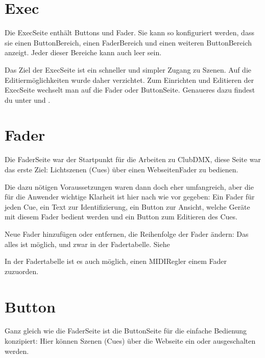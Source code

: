 \documentclass[letterpaper,10pt,ngerman]{sphinxmanual}
\begin{document}
\noindent{}


\section{Exec}
\label{\detokenize{arbeiten:exec}}
Die Exec\sphinxhyphen{}Seite enthält Buttons und Fader. Sie kann so konfiguriert werden,
dass sie einen Button\sphinxhyphen{}Bereich, einen Fader\sphinxhyphen{}Bereich und einen weiteren
Button\sphinxhyphen{}Bereich anzeigt. Jeder dieser Bereiche kann auch leer sein.

Das Ziel der Exec\sphinxhyphen{}Seite ist ein schneller und simpler Zugang zu Szenen.
Auf die Editiermöglichkeiten wurde daher verzichtet. Zum
Einrichten und Editieren der Exec\sphinxhyphen{}Seite wechselt man auf die Fader\sphinxhyphen{} oder
Button\sphinxhyphen{}Seite. Genaueres dazu findest du unter {\hyperref[\detokenize{einrichten:fader}]{}} und
{\hyperref[\detokenize{einrichten:buttons}]{}} .

\noindent{}


\section{Fader}
\label{\detokenize{arbeiten:fader}}
Die Fader\sphinxhyphen{}Seite war der Startpunkt für die Arbeiten zu ClubDMX, diese Seite
war das erste Ziel: Lichtszenen (Cues) über einen
Webseiten\sphinxhyphen{}Fader zu bedienen.

Die dazu nötigen Voraussetzungen waren dann doch eher umfangreich, aber die
für die Anwender wichtige Klarheit ist hier nach wie vor gegeben: Ein Fader für
jeden Cue,
ein Text zur Identifizierung, ein Button zur Ansicht, welche Geräte mit diesem
Fader bedient werden und ein Button zum Editieren des Cues.

Neue Fader hinzufügen oder entfernen, die Reihenfolge der Fader ändern: Das
alles ist möglich, und zwar in der Fadertabelle.
Siehe {\hyperref[\detokenize{einrichten:fader}]{}}

In der Fadertabelle ist es auch möglich, einen MIDI\sphinxhyphen{}Regler einem Fader
zuzuorden.


\section{Button}
\label{\detokenize{arbeiten:button}}
Ganz gleich wie die Fader\sphinxhyphen{}Seite ist die Button\sphinxhyphen{}Seite für die einfache
Bedienung konzipiert: Hier können Szenen (Cues) über die Webseite ein\sphinxhyphen{} oder
ausgeschalten werden.
\end{document}
